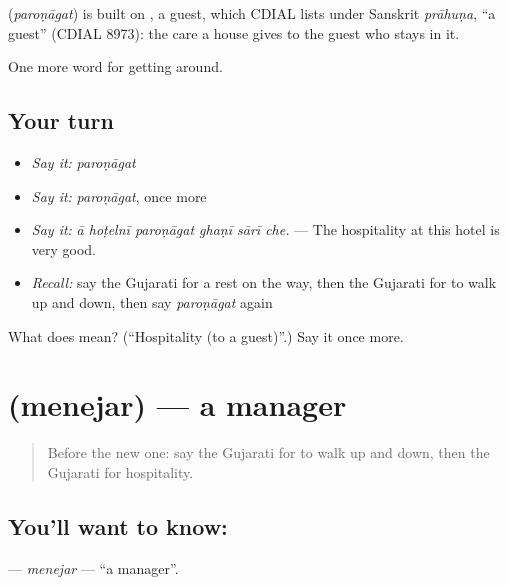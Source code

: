 \begin{cousinweb}
\textbf{} (\emph{paroṇāgat}) is built on , a guest, which CDIAL lists under Sanskrit \emph{prāhuṇa}, \textquotedblleft{}a guest\textquotedblright{} (CDIAL 8973): the care a house gives to the guest who stays in it.
\end{cousinweb}

\begin{grammarlens}[title={What you've built}]
One more word for getting around.
\end{grammarlens}

\subsection*{Your turn}
\begin{itemize}
\raggedright
  \item \emph{Say it:} \emph{paroṇāgat}
  \item \emph{Say it:} \emph{paroṇāgat}, once more
  \item \emph{Say it:} \emph{ā hoṭelnī paroṇāgat ghaṇī sārī che.} — The hospitality at this hotel is very good.
  \item \emph{Recall:} say the Gujarati for a rest on the way, then the Gujarati for to walk up and down, then say \emph{paroṇāgat} again
\end{itemize}

\begin{tcolorbox}[breakable,colback=teal!4,colframe=teal!35!black,title={Before you move on}]
What does  mean? (\textquotedblleft{}Hospitality (to a guest)\textquotedblright{}.) Say it once more.
\end{tcolorbox}
\section[\texorpdfstring{\gu{મેનેજર} (menejar)}{મેનેજર (menejar)}]{ (menejar) — a manager}

\label{lesson:GU-C409-menejar}



\begin{quote}
Before the new one: say the Gujarati for to walk up and down, then the Gujarati for hospitality.
\end{quote}

\subsection*{You'll want to know: }
\textbf{} — \emph{menejar} — \textquotedblleft{}a manager\textquotedblright{}.

